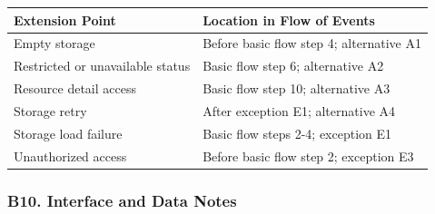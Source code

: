 \documentclass[12pt]{article}
\renewcommand{\baselinestretch}{1.5}
\begin{document}
\begingroup
\small
\renewcommand{\baselinestretch}{1.0}\selectfont
\renewcommand{\arraystretch}{1.15}
\setlength{\tabcolsep}{6pt}
\begin{longtable}{|>{\raggedright\arraybackslash}p{}|>{\raggedright\arraybackslash}p{}|}
\hline
\textbf{Extension Point} & \textbf{Location in Flow of Events} \\ \hline
\endhead
Empty storage & Before basic flow step 4; alternative A1 \\ \hline
Restricted or unavailable status & Basic flow step 6; alternative A2 \\ \hline
Resource detail access & Basic flow step 10; alternative A3 \\ \hline
Storage retry & After exception E1; alternative A4 \\ \hline
Storage load failure & Basic flow steps 2-4; exception E1 \\ \hline
Unauthorized access & Before basic flow step 2; exception E3 \\ \hline
\end{longtable}
\endgroup
\par\medskip

\hypertarget{sec:b10-interface-and-data-notes}{}
\subsubsection*{B10. Interface and Data Notes}
\par\medskip
\end{document}
